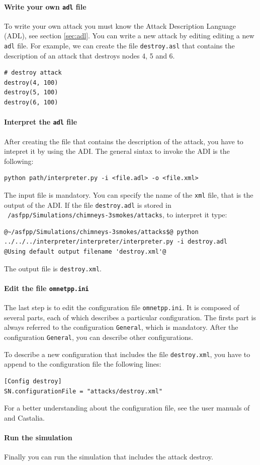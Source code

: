 \paragraph{Write your own \texttt{adl} file}
To write your own attack you must know the Attack Description Language (ADL), see section \ref{sec:adl}. You can write a new attack by editing editing a new \texttt{adl} file. For example, we can create the file \texttt{destroy.asl} that contains the description of an attack that destroys nodes 4, 5 and 6.
%
\begin{lstlisting}[language={adl}]
# destroy attack
destroy(4, 100)
destroy(5, 100)
destroy(6, 100)
\end{lstlisting}

\paragraph{Interpret the \texttt{adl} file}
After creating the file that contains the description of the attack, you have to intepret it by using the ADI. The general sintax to invoke the ADI is the following:
%
\begin{lstlisting}[language={terminal}]
python path/interpreter.py -i <file.adl> -o <file.xml>
\end{lstlisting}
%
The input file is mandatory. You can specify the name of the \texttt{xml} file, that is the output of the ADI. If the file \texttt{destroy.adl} is stored in \texttt{~/asfpp/Simulations/chimneys-3smokes/attacks}, to interpret it type:
%
\begin{lstlisting}[language={terminal}]
@~/asfpp/Simulations/chimneys-3smokes/attacks$@ python ../../../interpreter/interpreter/interpreter.py -i destroy.adl
@Using default output filename 'destroy.xml'@
\end{lstlisting}
%
The output file is \texttt{destroy.xml}.


\paragraph{Edit the file \texttt{omnetpp.ini}}
The last step is to edit the configuration file \texttt{omnetpp.ini}. It is composed of several parts, each of which describes a particular configuration.
The firsts part is always referred to the configuration \texttt{General}, which is mandatory. After the configuration \texttt{General}, you can describe other configurations. 

To describe a new configuration that includes the file \texttt{destroy.xml}, you have to append to the configuration file the following lines:
%
\begin{lstlisting}[language={terminal}]
[Config destroy]
SN.configurationFile = "attacks/destroy.xml"
\end{lstlisting}
%
For a better understanding about the configuration file, see the user manuals of \omnet and Castalia. 

\paragraph{Run the simulation}
Finally you can run the simulation that includes the attack destroy.